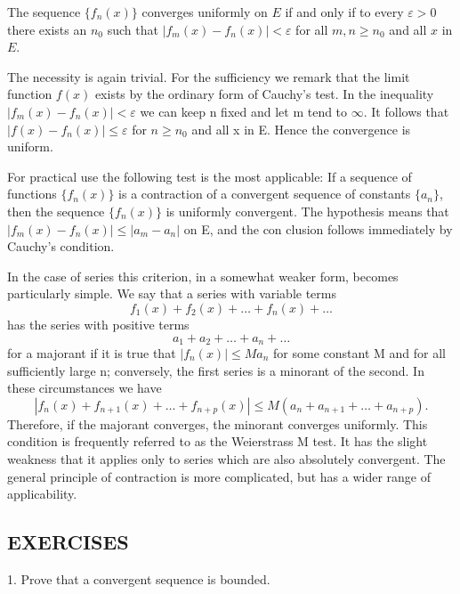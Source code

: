 The sequence $\{f_n(x)\}$ converges uniformly on $E$ if and only if to every $\varepsilon > 0$ there exists an $n_0$ such that $|f_m(x) - f_n(x)| < \varepsilon$ for all $m, n \geq n_0$ and all $x$ in $E$.

The necessity is again trivial. For the sufficiency we remark that the limit function $f(x)$ exists by the ordinary form of Cauchy's test. In the inequality $|f_{m}(x) - f_{n}(x)| < \varepsilon$ we can keep n fixed and let m tend to $\infty$. It follows that $|f(x) - f_{n}(x)| \leq \varepsilon$ for $n \geq n_{0}$ and all x in E. Hence the convergence is uniform.

For practical use the following test is the most applicable: If a sequence of functions $\{f_{n}(x)\}$ is a contraction of a convergent sequence of constants $\{a_{n}\}$, then the sequence $\{f_{n}(x)\}$ is uniformly convergent. The hypothesis means that $|f_{m}(x)-f_{n}(x)|\leq|a_{m}-a_{n}|$ on E, and the con%
%
clusion follows immediately by Cauchy's condition.

In the case of series this criterion, in a somewhat weaker form, becomes particularly simple. We say that a series with variable terms
\begin{equation*}
f _ {1} (x) + f _ {2} (x) + \dots + f _ {n} (x) + \dots
\end{equation*}
has the series with positive terms
\begin{equation*}
a _ {1} + a _ {2} + \dots + a _ {n} + \dots
\end{equation*}
for a majorant if it is true that $|f_{n}(x)| \leq Ma_{n}$ for some constant M and for all sufficiently large n; conversely, the first series is a minorant of the second. In these circumstances we have
\begin{equation*}
\left| f _ {n} (x) + f _ {n + 1} (x) + \dots + f _ {n + p} (x) \right| \leq M \left(a _ {n} + a _ {n + 1} + \dots + a _ {n + p}\right).
\end{equation*}
Therefore, if the majorant converges, the minorant converges uniformly. This condition is frequently referred to as the Weierstrass M test. It has the slight weakness that it applies only to series which are also absolutely convergent. The general principle of contraction is more complicated, but has a wider range of applicability.

\subsection*{EXERCISES}
1. Prove that a convergent sequence is bounded.

